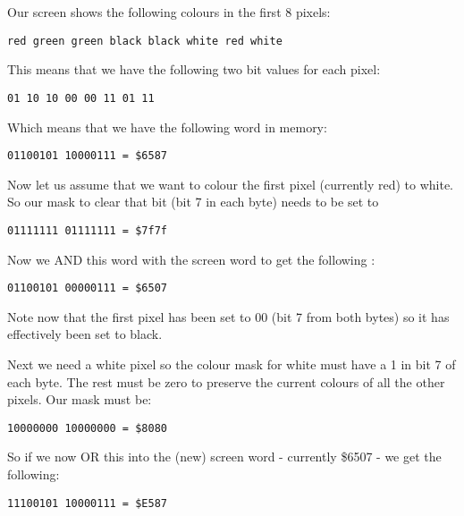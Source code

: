 Our screen shows the following colours in the first 8 pixels:

\begin{lstlisting}[frame=none,numbers=none]
red green green black black white red white
\end{lstlisting}

This means that we have the following two bit values for each pixel:

\begin{lstlisting}[firstnumber=1,frame=none,numbers=none]
01 10 10 00 00 11 01 11
\end{lstlisting}

Which means that we have the following word in memory:

\begin{lstlisting}[firstnumber=1,frame=none,numbers=none]
01100101 10000111 = $6587
\end{lstlisting}

Now let us assume that we want to colour the first pixel (currently
    red) to white. So our mask to clear that bit (bit 7 in each byte) needs to
    be set to

\begin{lstlisting}[firstnumber=1,frame=none,numbers=none]
01111111 01111111 = $7f7f
\end{lstlisting}

Now we AND this word with the screen word to get the following
   :

\begin{lstlisting}[firstnumber=1,frame=none,numbers=none]
01100101 00000111 = $6507
\end{lstlisting}

Note now that the first pixel has been set to 00 (bit 7 from both
    bytes) so it has effectively been set to black.

Next we need a white pixel so the colour mask for white must have a
    1 in bit 7 of each byte. The rest must be zero to preserve the current
    colours of all the other pixels. Our mask must be:

\begin{lstlisting}[firstnumber=1,frame=none,numbers=none]
10000000 10000000 = $8080
\end{lstlisting}

So if we now OR this into the (new) screen word -{} currently \$6507 -{}
    we get the following:

\begin{lstlisting}[firstnumber=1,frame=none,numbers=none]
11100101 10000111 = $E587
\end{lstlisting}

